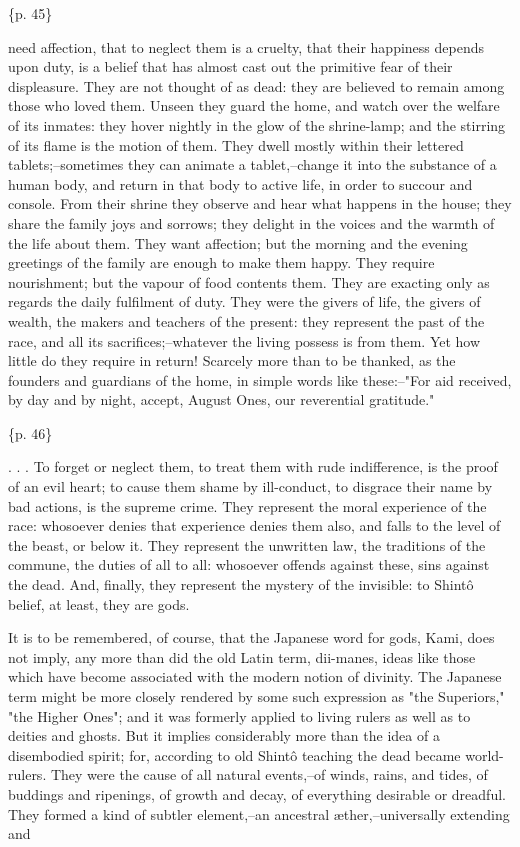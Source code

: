 \{p. 45\}

need affection, that to neglect them is a cruelty, that their happiness depends upon duty, is a belief that has almost cast out the primitive fear of their displeasure. They are not thought of as dead: they are believed to remain among those who loved them. Unseen they guard the home, and watch over the welfare of its inmates: they hover nightly in the glow of the shrine-lamp; and the stirring of its flame is the motion of them. They dwell mostly within their lettered tablets;--sometimes they can animate a tablet,--change it into the substance of a human body, and return in that body to active life, in order to succour and console. From their shrine they observe and hear what happens in the house; they share the family joys and sorrows; they delight in the voices and the warmth of the life about them. They want affection; but the morning and the evening greetings of the family are enough to make them happy. They require nourishment; but the vapour of food contents them. They are exacting only as regards the daily fulfilment of duty. They were the givers of life, the givers of wealth, the makers and teachers of the present: they represent the past of the race, and all its sacrifices;--whatever the living possess is from them. Yet how little do they require in return! Scarcely more than to be thanked, as the founders and guardians of the home, in simple words like these:--"For aid received, by day and by night, accept, August Ones, our reverential gratitude."

\{p. 46\}

. . . To forget or neglect them, to treat them with rude indifference, is the proof of an evil heart; to cause them shame by ill-conduct, to disgrace their name by bad actions, is the supreme crime. They represent the moral experience of the race: whosoever denies that experience denies them also, and falls to the level of the beast, or below it. They represent the unwritten law, the traditions of the commune, the duties of all to all: whosoever offends against these, sins against the dead. And, finally, they represent the mystery of the invisible: to Shintô belief, at least, they are gods.



It is to be remembered, of course, that the Japanese word for gods, Kami, does not imply, any more than did the old Latin term, dii-manes, ideas like those which have become associated with the modern notion of divinity. The Japanese term might be more closely rendered by some such expression as "the Superiors," "the Higher Ones"; and it was formerly applied to living rulers as well as to deities and ghosts. But it implies considerably more than the idea of a disembodied spirit; for, according to old Shintô teaching the dead became world-rulers. They were the cause of all natural events,--of winds, rains, and tides, of buddings and ripenings, of growth and decay, of everything desirable or dreadful. They formed a kind of subtler element,--an ancestral æther,--universally extending and

